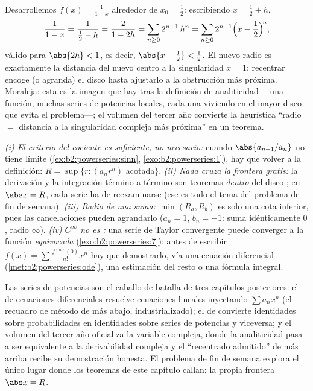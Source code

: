 \begin{example}\label{ex:b2:powerseries:recenter}
Desarrollemos $f(x) = \frac{1}{1-x}$ alrededor de $x_0 = \frac12$:
escribiendo $x = \frac12 + h$,
\[
\frac{1}{1 - x} = \frac{1}{\frac12 - h}
= \frac{2}{1 - 2h}
= \sum_{n\geq0} 2^{n+1}\,h^n
= \sum_{n\geq0} 2^{n+1}\Bigl(x - \frac12\Bigr)^{\!n},
\]
válido para $\abs{2h} < 1$, es decir, $\abs{x - \frac12} <
\frac12$. El nuevo radio es exactamente la distancia del nuevo
centro a la singularidad $x = 1$: recentrar encoge (o agranda) el
disco hasta ajustarlo a la obstrucción más próxima. Moraleja: esta
es la imagen que hay tras la definición de analiticidad ---una
función, muchas series de potencias locales, cada una viviendo en el
mayor disco que evita el problema---; el volumen del tercer año
convierte la heurística ``radio $=$ distancia a la singularidad
compleja más próxima'' en un teorema.
\end{example}

\begin{remark}
\emph{(i) El criterio del cociente es suficiente, no necesario:}
cuando $\abs{a_{n+1}/a_n}$ no tiene límite
(\cref{ex:b2:powerseries:sinn}, \cref{exo:b2:powerseries:1}), hay
que volver a la definición: $R = \sup\{r : (a_nr^n)$ acotada$\}$.
\emph{(ii) Nada cruza la frontera gratis:} la derivación y la
integración término a término son teoremas \emph{dentro} del disco
; en $\abs x = R$, cada serie ha de reexaminarse (ese es todo
el tema del problema de fin de semana). \emph{(iii) Radio de una
suma:} $\min(R_a, R_b)$ es solo una cota inferior, pues las
cancelaciones pueden agrandarlo ($a_n = 1$, $b_n = -1$: suma
idénticamente $0$, radio $\infty$). \emph{(iv) $C^\infty$ no es
:} una serie de Taylor convergente puede converger a la
función \emph{equivocada} (\cref{exo:b2:powerseries:7}); antes de
escribir $f(x) = \sum \frac{f^{(n)}(0)}{n!}x^n$ hay que
demostrarlo, vía una ecuación diferencial
(\cref{met:b2:powerseries:ode}), una estimación del resto o una
fórmula integral.
\end{remark}

\begin{remark}
Las series de potencias son el caballo de batalla de tres capítulos
posteriores: el de ecuaciones diferenciales resuelve ecuaciones
lineales inyectando $\sum a_nx^n$ (el recuadro de método de más
abajo, industrializado); el de  convierte
identidades sobre probabilidades en identidades sobre series de
potencias y viceversa; y el volumen del tercer año oficializa la
variable compleja, donde la analiticidad pasa a ser equivalente a la
derivabilidad compleja y el ``recentrado admitido'' de más arriba
recibe su demostración honesta. El problema de fin de semana explora
el único lugar donde los teoremas de este capítulo callan: la propia
frontera $\abs x = R$.
\end{remark}

